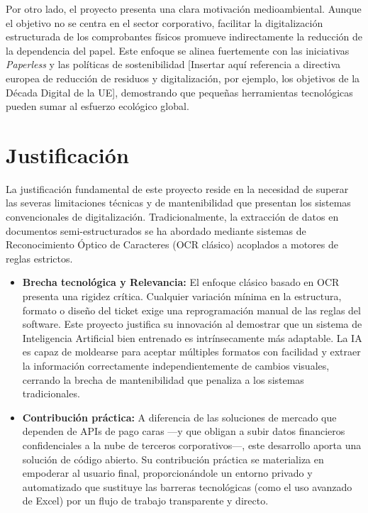 \documentclass[%
    school=etsisi,%
    type=pfg,%
    degree=61CI,%
]{upm-report}
\begin{document}
Por otro lado, el proyecto presenta una clara motivación medioambiental. Aunque el objetivo no se centra en el sector corporativo, facilitar la digitalización estructurada de los comprobantes físicos promueve indirectamente la reducción de la dependencia del papel. Este enfoque se alinea fuertemente con las iniciativas \textit{Paperless} y las políticas de sostenibilidad [Insertar aquí referencia a directiva europea de reducción de residuos y digitalización, por ejemplo, los objetivos de la Década Digital de la UE], demostrando que pequeñas herramientas tecnológicas pueden sumar al esfuerzo ecológico global.

\section{Justificación}
La justificación fundamental de este proyecto reside en la necesidad de superar las severas limitaciones técnicas y de mantenibilidad que presentan los sistemas convencionales de digitalización. Tradicionalmente, la extracción de datos en documentos semi-estructurados se ha abordado mediante sistemas de Reconocimiento Óptico de Caracteres (OCR clásico) acoplados a motores de reglas estrictos.

\begin{itemize}
    \item \textbf{Brecha tecnológica y Relevancia:} El enfoque clásico basado en OCR presenta una rigidez crítica. Cualquier variación mínima en la estructura, formato o diseño del ticket exige una reprogramación manual de las reglas del software. Este proyecto justifica su innovación al demostrar que un sistema de Inteligencia Artificial bien entrenado es intrínsecamente más adaptable. La IA es capaz de moldearse para aceptar múltiples formatos con facilidad y extraer la información correctamente independientemente de cambios visuales, cerrando la brecha de mantenibilidad que penaliza a los sistemas tradicionales.
    \item \textbf{Contribución práctica:} A diferencia de las soluciones de mercado que dependen de APIs de pago caras —y que obligan a subir datos financieros confidenciales a la nube de terceros corporativos—, este desarrollo aporta una solución de código abierto. Su contribución práctica se materializa en empoderar al usuario final, proporcionándole un entorno privado y automatizado que sustituye las barreras tecnológicas (como el uso avanzado de Excel) por un flujo de trabajo transparente y directo.
\end{itemize}






\end{document}
